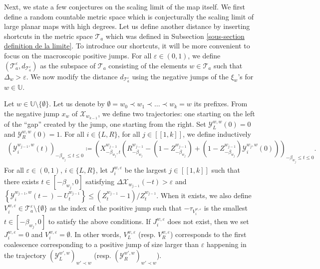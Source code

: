 \documentclass[11pt]{article}
\numberwithin{equation}{section}
\def\vp{\varepsilon}
\def \U{\mathbb{U}}
\def \T{\mathcal{T}}
\def\lb{[\![}
\def\rb{]\!]}
\begin{document}
Next, we state a few conjectures on the scaling limit of the map itself. We first define a random countable metric space which is conjecturally the scaling limit of large planar maps with high degrees. Let us define another distance by inserting shortcuts in the metric space $\T_a$ {which was defined in Subsection \ref{sous-section definition de la limite}}. To introduce our shortcuts, it will be more convenient to focus on the macroscopic positive jumps. For all $\vp \in (0,1)$, we define $(\T_a^\vp,d_{\T_a^\vp})$ as the subspace of $\T_a$ consisting of the elements $w\in \T_a$ such that $\Delta_w>\vp$. We now modify the distance $d_{\T_a^\vp}$ using the negative jumps of the $\xi_w$'s for $w\in \U$. 

Let $w\in \U\setminus \{\emptyset\}$. Let us denote by $\emptyset = w_0 \prec w_1 \prec \ldots \prec w_k  = w$ its prefixes. From the negative jump $x_{w}$ of $\mathcal{X}_{w_{k-1}}$, we define two trajectories: one starting on the left of the ``gap'' created by the jump, one starting from the right. Set $\mathcal{Y}^{w,w}_L(0)=0$ and $\mathcal{Y}^{w,w}_R(0)=1$. For all $i \in \{L,R\}$, for all $j \in \lb 1, k\rb$, we define inductively
\begin{align*}
	(\mathcal{Y}_i^{w_{j-1},w}(t))_{-\beta_{w_j}\le t \le 0} \coloneqq \left(X^{w_{j-1}}_{-\beta_{w_j},t}\left(
	R^{w_{j-1}}_{-\beta_{w_j}}
	-(1- Z^{w_{j-1}}_{-\beta_{w_j}}) + (1-Z^{w_{j-1}}_{-\beta_{w_j}})\mathcal{Y}_i^{w_j,w}(0)
	\right)\right)_{ -\beta_{w_j}\le t\le0}.
\end{align*}
For all $\vp \in (0,1)$, $i \in \{L,R\}$, let $J_i^{w,\vp}$ be the largest $j\in \lb 1, k \rb$ such that there exists $t\in [-\beta_{w_j},0]$ satisfying $\Delta \mathcal{X}_{w_{j-1}} (-t) >\vp$ and $
\left\{\mathcal{Y}_i^{w_{j-1},w}(t-) - U^{w_{j-1}}_t\right\} \le (Z^{w_{j-1}}_t -1)/{Z^{w_{j-1}}_t}.$
When it exists, we also define $V^{w,\vp}_i \in \T^\vp_a\setminus\{\emptyset\}$ as the index of the positive jump such that $-\tau_{V_i^{w,\vp}}$ is the smallest $t\in [-\beta_{w_j},0]$ to satisfy the above conditions. If $J_i^{w,\vp}$ does not exist, then we set $J^{w,\vp}_i=0$ and $V^{w,\vp}_i=\emptyset$. In other words, $V^{w,\vp}_L$ (resp. $V^{w,\vp}_R$) corresponds to the first coalescence corresponding to a positive jump of size larger than $\vp$ happening in the trajectory $(\mathcal{Y}_L^{w',w})_{w'\prec w}$ (resp. $(\mathcal{Y}_R^{w',w})_{w'\prec w}$). 
\end{document}
